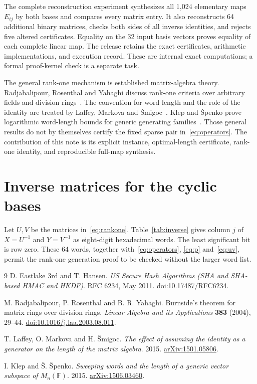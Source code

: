 \documentclass[11pt,a4paper]{article}
\theoremstyle{definition}\newtheorem{definition}[theorem]{Definition}
\begin{document}
The complete reconstruction experiment synthesizes all 1,024 elementary
maps $E_{ij}$ by both bases and compares every matrix entry. It also
reconstructs 64 additional binary matrices, checks both sides of all
inverse identities, and rejects five altered certificates. Equality on
the 32 input basis vectors proves equality of each complete linear map.
The release retains the exact certificates, arithmetic implementations,
and execution record. These are internal exact computations; a formal
proof-kernel check is a separate task.

The general rank-one mechanism is established matrix-algebra theory.
Radjabalipour, Rosenthal and Yahaghi discuss rank-one criteria over arbitrary
fields and division rings~\cite{radjabalipour}. The convention for word
length and the role of the identity are treated by Laffey, Markova and
\v{S}migoc~\cite{laffey}. Klep and \v{S}penko prove logarithmic word-length
bounds for generic generating families~\cite{klep}. Those general results
do not by themselves certify the fixed sparse pair in~\eqref{eq:operators}.
The contribution of this note is its explicit instance, optimal-length
certificate, rank-one identity, and reproducible full-map synthesis.

\appendix
\section{Inverse matrices for the cyclic bases}
Let $U,V$ be the matrices in~\eqref{eq:rankone}. Table~\ref{tab:inverse}
gives column $j$ of $X=U^{-1}$ and $Y=V^{-1}$ as eight-digit hexadecimal
words. The least significant bit is row zero. These 64 words, together
with~\eqref{eq:operators}, \eqref{eq:p} and~\eqref{eq:uv}, permit the
rank-one generation proof to be checked without the larger word list.


\begin{thebibliography}{9}
D. Eastlake 3rd and T. Hansen.
\textit{US Secure Hash Algorithms (SHA and SHA-based HMAC and HKDF)}.
RFC 6234, May 2011. \href{https://doi.org/10.17487/RFC6234}{doi:10.17487/RFC6234}.

M. Radjabalipour, P. Rosenthal and B. R. Yahaghi.
Burnside's theorem for matrix rings over division rings.
\textit{Linear Algebra and its Applications} \textbf{383} (2004), 29--44.
\href{https://doi.org/10.1016/j.laa.2003.08.011}{doi:10.1016/j.laa.2003.08.011}.

T. Laffey, O. Markova and H. \v{S}migoc.
\textit{The effect of assuming the identity as a generator on the length of
the matrix algebra}. 2015.
\href{https://arxiv.org/abs/1501.05806}{arXiv:1501.05806}.

I. Klep and \v{S}. \v{S}penko.
\textit{Sweeping words and the length of a generic vector subspace of
$M_n(\mathbb F)$}. 2015.
\href{https://arxiv.org/abs/1506.03460}{arXiv:1506.03460}.
\end{thebibliography}
\end{document}

